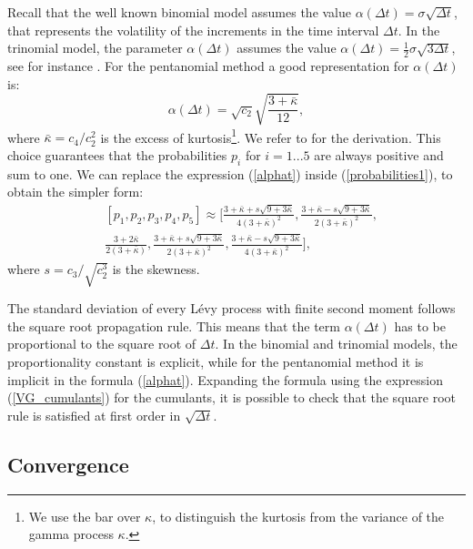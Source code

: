 Recall that the well known binomial model \cite{CRR79} assumes the value $\alpha(\Delta t) = \sigma \sqrt{\Delta t}$,
that represents the volatility of the increments in the time interval $\Delta t$.
In the trinomial model, the parameter $\alpha(\Delta t)$ assumes the value $\alpha(\Delta t) = \frac{1}{2} \sigma \sqrt{3\Delta t}$, see for instance \cite{YaPr01}.
For the pentanomial method a good representation for $\alpha(\Delta t)$ is:
\begin{equation}\label{alphat}
 \alpha(\Delta t) = \sqrt{c_2} \sqrt{\frac{3+\bar \kappa}{12}},
\end{equation}
where $\bar \kappa = c_4 / c_2^2$ is the excess of kurtosis\footnote{We use the bar over $\kappa$, 
to distinguish the kurtosis from the variance of the gamma process $\kappa$.}. 
We refer to \cite{YaPr06} for the derivation.
This choice guarantees that the probabilities $p_i$ for $i=1...5$ are always positive and sum to one. We can replace the expression
(\ref{alphat}) inside (\ref{probabilities1}), to obtain the simpler form:
\begin{align}\label{probabilities2}
 & [p_1,p_2,p_3,p_4,p_5] \approx \biggl[ \frac{3+\bar \kappa+s\sqrt{9+3\bar \kappa}}{4(3+\bar \kappa)^2} , 
 \frac{3+\bar \kappa-s\sqrt{9+3\bar \kappa}}{2(3+\bar \kappa)^2} , \\ \nonumber
 &
 \frac{3+2\bar \kappa}{2(3+\bar \kappa)} ,
 \frac{3+\bar \kappa+s\sqrt{9+3\bar \kappa}}{2(3+\bar \kappa)^2} ,
 \frac{3+\bar \kappa-s\sqrt{9+3\bar \kappa}}{4(3+\bar \kappa)^2} \biggr],
\end{align}
where $s = c_3 / \sqrt{c_2^3}$ is the skewness.
\begin{Remark}
 The standard deviation of every L\'{e}vy process with finite second moment follows the square root propagation rule. This means that the term $\alpha(\Delta t)$ has to be proportional
 to the square root of $\Delta t$. In the binomial and trinomial models, the proportionality constant is explicit, while for the pentanomial method it is implicit
 in the formula (\ref{alphat}). Expanding the formula using the expression (\ref{VG_cumulants}) for the cumulants, it is possible to check that the square root rule is
 satisfied at first order in $\sqrt{\Delta t}$.
\end{Remark}



\subsection{Convergence}


